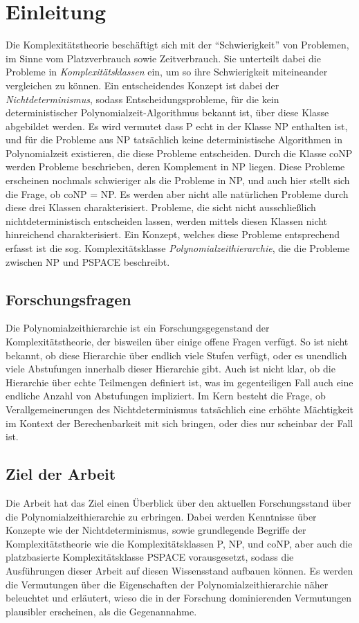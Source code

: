\chapter{Einleitung}
Die Komplexitätstheorie beschäftigt sich mit der \enquote{Schwierigkeit} von Problemen, im Sinne vom Platzverbrauch sowie Zeitverbrauch. Sie unterteilt dabei die Probleme in \emph{Komplexitätsklassen} ein, 
um so ihre Schwierigkeit miteineander vergleichen zu können. Ein entscheidendes Konzept ist dabei der \emph{Nichtdeterminismus}, sodass Entscheidungsprobleme, für die kein deterministischer Polynomialzeit-Algorithmus bekannt ist,
über diese Klasse abgebildet werden. Es wird vermutet dass P echt in der Klasse NP enthalten ist, und für die Probleme aus NP tatsächlich keine deterministische Algorithmen in Polynomialzeit existieren, die diese Probleme entscheiden.
Durch die Klasse coNP werden Probleme beschrieben, deren Komplement in NP liegen. Diese Probleme erscheinen nochmals schwieriger als die Probleme in NP, und auch hier stellt sich die Frage, ob coNP = NP.
Es werden aber nicht alle natürlichen Probleme durch diese drei Klassen charakterisiert. Probleme, die sicht nicht ausschließlich nichtdeterministisch entscheiden lassen, werden mittels diesen Klassen nicht hinreichend charakterisiert.
Ein Konzept, welches diese Probleme entsprechend erfasst ist die sog. Komplexitätsklasse \emph{Polynomialzeithierarchie}, die die Probleme zwischen NP und PSPACE beschreibt. 

\section{Forschungsfragen}
Die Polynomialzeithierarchie ist ein Forschungsgegenstand der Komplexitätstheorie, der bisweilen über einige offene Fragen verfügt. 
So ist nicht bekannt, ob diese Hierarchie über endlich viele Stufen verfügt, oder es unendlich viele Abstufungen innerhalb dieser Hierarchie gibt.
Auch ist nicht klar, ob die Hierarchie über echte Teilmengen definiert ist, was im gegenteiligen Fall auch eine endliche Anzahl von Abstufungen impliziert.
Im Kern besteht die Frage, ob Verallgemeinerungen des Nichtdeterminismus tatsächlich eine erhöhte Mächtigkeit im Kontext der Berechenbarkeit mit sich bringen, oder dies nur scheinbar der Fall ist.

\section{Ziel der Arbeit}
Die Arbeit hat das Ziel einen Überblick über den aktuellen Forschungsstand über die Polynomialzeithierarchie zu erbringen. Dabei werden Kenntnisse über Konzepte wie der Nichtdeterminismus, sowie grundlegende Begriffe der Komplexitätstheorie
wie die Komplexitätsklassen P, NP, und coNP, aber auch die platzbasierte Komplexitätsklasse PSPACE vorausgesetzt, sodass die Ausführungen dieser Arbeit auf diesen Wissensstand aufbauen können.
Es werden die Vermutungen über die Eigenschaften der Polynomialzeithierarchie näher beleuchtet und erläutert, wieso die in der Forschung dominierenden Vermutungen plausibler erscheinen, als die Gegenannahme.

